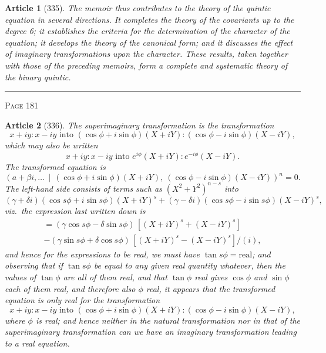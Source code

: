 \documentclass[11pt,a4paper]{article}
\theoremstyle{cayley}
\newtheorem{art}{Article}
\begin{document}
\begin{art}[335]
The memoir thus contributes to the theory of the quintic equation in several directions. It completes the theory of the covariants up to the degree 6; it establishes the criteria for the determination of the character of the equation; it develops the theory of the canonical form; and it discusses the effect of imaginary transformations upon the character. These results, taken together with those of the preceding memoirs, form a complete and systematic theory of the binary quintic.
\end{art}

\vspace{1em}
\noindent\rule{\textwidth}{0.4pt}
\begin{center}\textsc{Page 181}\end{center}
\newpage

\begin{art}[336]
The superimaginary transformation is the transformation
\[
x+iy : x-iy \text{ into } (\cos\phi + i\sin\phi)(X+iY) : (\cos\phi - i\sin\phi)(X-iY),
\]
which may also be written
\[
x+iy : x-iy \text{ into } e^{i\phi}(X+iY) : e^{-i\phi}(X-iY).
\]
The transformed equation is
\[
(a+\beta i, \ldots \,\mid\, (\cos\phi + i\sin\phi)(X+iY),\ (\cos\phi - i\sin\phi)(X-iY))^n = 0.
\]
The left-hand side consists of terms such as $(X^2+Y^2)^{n-s}$ into
\[
(\gamma + \delta i)(\cos s\phi + i\sin s\phi)(X+iY)^s + (\gamma - \delta i)(\cos s\phi - i\sin s\phi)(X-iY)^s,
\]
viz.\ the expression last written down is
\begin{multline*}
= (\gamma\cos s\phi - \delta\sin s\phi)\,[(X+iY)^s + (X-iY)^s] \\
- (\gamma\sin s\phi + \delta\cos s\phi)\,[(X+iY)^s - (X-iY)^s]/(i),
\end{multline*}
and hence for the expressions to be real, we must have $\tan s\phi = \text{real}$; and observing that if $\tan s\phi$ be equal to any given real quantity whatever, then the values of $\tan\phi$ are all of them real, and that $\tan\phi$ real gives $\cos\phi$ and $\sin\phi$ each of them real, and therefore also $\phi$ real, it appears that the transformed equation is only real for the transformation
\[
x+iy : x-iy \text{ into } (\cos\phi + i\sin\phi)(X+iY) : (\cos\phi - i\sin\phi)(X-iY),
\]
where $\phi$ is real; and hence neither in the natural transformation nor in that of the superimaginary transformation can we have an imaginary transformation leading to a real equation.
\end{art}
\end{document}
